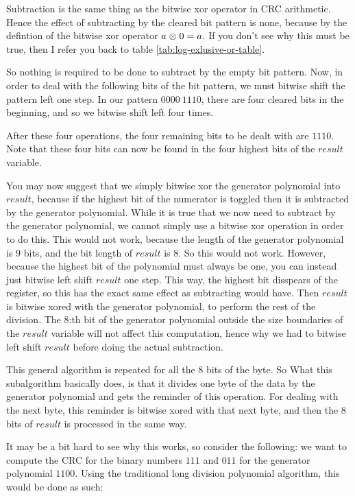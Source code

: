 Subtraction is the same thing as the bitwise xor operator in CRC
arithmetic. Hence the effect of subtracting by the cleared bit pattern
is none, because by the defintion of the bitwise xor operator $a
\mathrel{\otimes} 0 = a$. If you don't see why this must be true, then I refer
you back to table \ref{tab:log-exlusive-or-table}.

So nothing is required to be done to subtract by the empty bit
pattern. Now, in order to deal with the following bits of the bit
pattern, we must bitwise shift the pattern left one step. In our
pattern $0000\ 1110$, there are four cleared bits in the beginning,
and so we bitwise shift left four times.

After these four operations, the four remaining bits to be dealt with
are $1110$. Note that these four bits can now be found in the four
highest bits of the $result$ variable.

You may now suggest that we simply bitwise xor the generator
polynomial into $result$, because if the highest bit of the numerator
is toggled then it is subtracted by the generator polynomial. While it
is true that we now need to subtract by the generator polynomial, we
cannot simply use a bitwise xor operation in order to do this. This
would not work, because the length of the generator polynomial is $9$
bits, and the bit length of $result$ is $8$. So this would not
work. However, because the highest bit of the polynomial must always
be one, you can instead just bitwise left shift $result$ one
step. This way, the highest bit disspears of the register, so this has
the exact same effect as subtracting would have. Then $result$ is
bitwise xored with the generator polynomial, to perform the rest of
the division. The $8$:th bit of the generator polynomial outside the
size boundaries of the $result$ variable will not affect this
computation, hence why we had to bitwise left shift $result$ before
doing the actual subtraction.

This general algorithm is repeated for all the 8 bits of the byte. So
What this subalgorithm basically does, is that it divides one byte of
the data by the generator polynomial and gets the reminder of this
operation. For dealing with the next byte, this reminder is bitwise
xored with that next byte, and then the 8 bits of $result$ is
processed in the same way.

It may be a bit hard to see why this works, so consider the following:
we want to compute the CRC for the binary numbers $111$ and $011$ for
the generator polynomial $1100$. Using the traditional long division
polynomial algorithm, this would be done as such:

